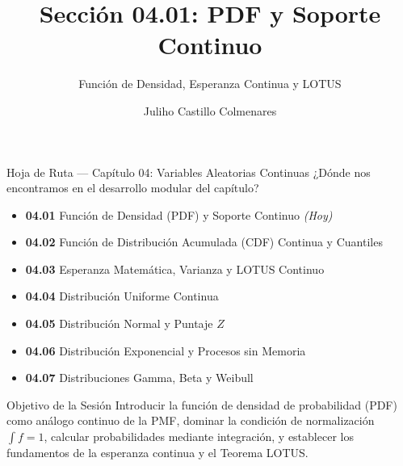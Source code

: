 \documentclass[10pt, aspectratio=169]{beamer}
\title[PDF y Soporte Continuo]{Sección 04.01: PDF y Soporte Continuo}
\subtitle{Función de Densidad, Esperanza Continua y LOTUS}
\author[J. Castillo Colmenares]{Juliho Castillo Colmenares}
\institute{Tecnológico de Monterrey}
\date{\vspace{-1.2cm}}
\begin{document}
\begin{frame}[plain]
  \vspace{-0.8cm}
  \titlepage
\end{frame}

\begin{frame}{Hoja de Ruta --- Capítulo 04: Variables Aleatorias Continuas}
  \footnotesize
  ¿Dónde nos encontramos en el desarrollo modular del capítulo? \pause
  \begin{itemize}\itemsep=0.08em
    \item \textbf{04.01} Función de Densidad (PDF) y Soporte Continuo \emph{(Hoy)} \pause
    \item \textbf{04.02} Función de Distribución Acumulada (CDF) Continua y Cuantiles \pause
    \item \textbf{04.03} Esperanza Matemática, Varianza y LOTUS Continuo \pause
    \item \textbf{04.04} Distribución Uniforme Continua \pause
    \item \textbf{04.05} Distribución Normal y Puntaje $Z$ \pause
    \item \textbf{04.06} Distribución Exponencial y Procesos sin Memoria \pause
    \item \textbf{04.07} Distribuciones Gamma, Beta y Weibull
  \end{itemize}
  \vspace{-0.05cm}
  \begin{block}{Objetivo de la Sesión}
    Introducir la función de densidad de probabilidad (PDF) como análogo continuo de la PMF, dominar la condición de normalización $\int f = 1$, calcular probabilidades mediante integración, y establecer los fundamentos de la esperanza continua y el Teorema LOTUS.
  \end{block}
\end{frame}
\end{document}
